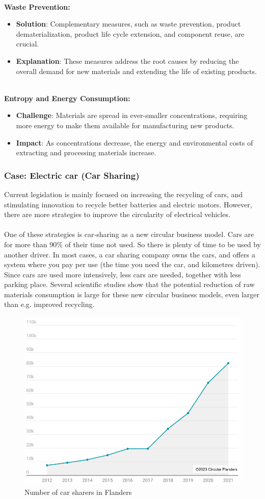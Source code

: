\documentclass[../summary.tex]{subfiles}
\begin{document}
\ \\
\textbf{Waste Prevention:}
\begin{itemize}
	\item \textbf{Solution}: Complementary measures, such as waste prevention, product dematerialization, product life cycle extension, and component reuse, are crucial.
	\item\textbf{Explanation}: These measures address the root causes by reducing the overall demand for new materials and extending the life of existing products.
\end{itemize}
\ \\
\textbf{Entropy and Energy Consumption:}
\begin{itemize}
	\item \textbf{Challenge}: Materials are spread in ever-smaller concentrations, requiring more energy to make them available for manufacturing new products.
	\item \textbf{Impact}: As concentrations decrease, the energy and environmental costs of extracting and processing materials increase.
\end{itemize}
\newpage

\subsubsection{Case: Electric car (Car Sharing)}

Current legislation is mainly focused on increasing the recycling of cars, and stimulating innovation to recycle better batteries and electric motors. However, there are more strategies to improve the circularity of electrical vehicles.\\
\\
One of these strategies is car-sharing as a new circular business model. Cars are for more than 90\% of their time not used. So there is plenty of time to be used by another driver. In most cases, a car sharing company owns the cars, and offers a system where you pay per use (the time you need the car, and kilometres driven). Since cars are used more intensively, less cars are needed, together with less parking place. Several scientific studies show that the potential reduction of raw materials consumption is large for these new circular business models, even larger than e.g. improved recycling. 

\begin{figure}[H]
	\centering
	\includegraphics[width=0.7\linewidth]{../images/number-of-car-sharers-in-flanders}
	\caption{Number of car sharers in Flanders}
	\label{fig:number-of-car-sharers-in-flanders}
\end{figure}
\end{document}
